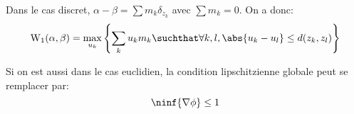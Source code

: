 \begin{remarque}
	Dans le cas discret, $\alpha - \beta = \sum m_{k}\delta_{z_{k}}$ avec $\sum m_{k} = 0$.
	On a donc:
	\begin{equation*}
		\Wass_{1}(\alpha, \beta) = \max_{u_{k}} \left\{\sum_{k} u_{k}m_{k} \suchthat \forall k, l, \abs{u_{k} - u_{l}} \leq d(z_{k}, z_{l})\right\}
	\end{equation*}
\end{remarque}

\begin{remarque}
	Si on est aussi dans le cas euclidien, la condition lipschitzienne globale peut se remplacer par:
	\begin{equation*}
		\ninf{\nabla \phi} \leq 1
	\end{equation*}
\end{remarque}
